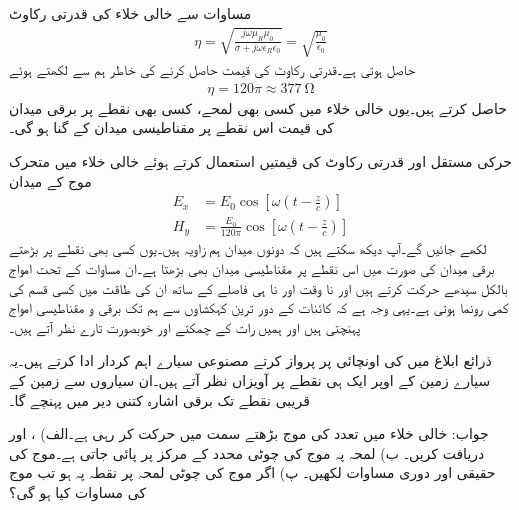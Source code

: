 مساوات  سے خالی خلاء کی قدرتی رکاوٹ
\begin{align*}
\eta =\sqrt{\frac{j \omega \mu_R \mu_0}{\sigma +j \omega \epsilon_R \epsilon_0}}=\sqrt{\frac{\mu_0}{\epsilon_0}}
\end{align*}
حاصل ہوتی ہے۔قدرتی رکاوٹ کی قیمت حاصل کرنے کی خاطر ہم  سے  لکھتے ہوئے
\begin{align}
\eta=120 \pi \approx \SI{377}{\ohm}
\end{align}
حاصل کرتے ہیں۔یوں خالی خلاء میں کسی بھی لمحے، کسی بھی نقطے پر برقی میدان کی قیمت اس نقطے پر مقناطیسی میدان کے  گنا ہو گی۔

حرکی مستقل اور قدرتی رکاوٹ کی قیمتیں استعمال کرتے ہوئے خالی خلاء میں متحرک موج کے میدان
\begin{align*}
E_x&=E_0 \cos \left[\omega \left( t -\frac{z}{c} \right)\right]\\
H_y&=\frac{E_0}{120 \pi} \cos \left[ \omega \left( t -\frac{z}{c} \right) \right]
\end{align*}
لکھے جائیں گے۔آپ دیکھ سکتے ہیں کہ دونوں میدان ہم زاویہ ہیں۔یوں کسی بھی نقطے پر بڑھتے برقی میدان کی صورت میں اس نقطے پر مقناطیسی میدان بھی بڑھتا ہے۔ان مساوات کے تحت امواج بالکل سیدھے حرکت کرتے ہیں اور نا وقت اور نا ہی فاصلے کے ساتھ ان کی طاقت میں کسی قسم کی کمی رونما ہوتی ہے۔یہی وجہ ہے کہ کائنات کے دور ترین کہکشاوں سے ہم تک برقی و مقناطیسی امواج پہنچتی ہیں اور ہمیں رات کے چمکتے اور خوبصورت تارے نظر آتے ہیں۔


 ذرائع ابلاغ میں  کی اونچائی پر پرواز کرتے مصنوعی سیارے اہم کردار ادا کرتے ہیں۔یہ سیارے زمین کے اوپر ایک ہی نقطے پر آویزاں نظر آتے ہیں۔ان سیاروں سے زمین کے قریبی نقطے تک برقی اشارہ کتنی دیر میں پہنچے گا۔

جواب:
خالی خلاء میں  تعدد کی موج بڑھتے  سمت میں حرکت کر رہی ہے۔الف) ،  اور  دریافت کریں۔ ب) لمحہ  پہ موج کی  چوٹی  محدد کے مرکز پر پائی جاتی ہے۔موج کی حقیقی اور دوری مساوات لکھیں۔ پ) اگر موج کی چوٹی لمحہ  پر نقطہ  پہ ہو تب موج کی مساوات کیا ہو گی؟ 

